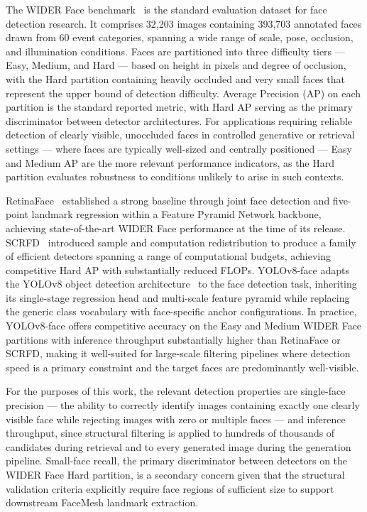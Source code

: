 The WIDER Face benchmark~\cite{Yang_2016_WIDERFace} is the standard
evaluation dataset for face detection research. It comprises 32,203 images
containing 393,703 annotated faces drawn from 60 event categories, spanning
a wide range of scale, pose, occlusion, and illumination conditions. Faces
are partitioned into three difficulty tiers --- Easy, Medium, and Hard ---
based on height in pixels and degree of occlusion, with the Hard partition
containing heavily occluded and very small faces that represent the upper
bound of detection difficulty. Average Precision (AP) on each partition is
the standard reported metric, with Hard AP serving as the primary
discriminator between detector architectures. For applications requiring
reliable detection of clearly visible, unoccluded faces in controlled
generative or retrieval settings --- where faces are typically well-sized
and centrally positioned --- Easy and Medium AP are the more relevant
performance indicators, as the Hard partition evaluates robustness to
conditions unlikely to arise in such contexts.

RetinaFace~\cite{Deng_2020_RetinaFace} established a strong baseline
through joint face detection and five-point landmark regression within a
Feature Pyramid Network backbone, achieving state-of-the-art WIDER Face
performance at the time of its release. SCRFD~\cite{Guo_2021_SCRFD}
introduced sample and computation redistribution to produce a family of
efficient detectors spanning a range of computational budgets, achieving
competitive Hard AP with substantially reduced FLOPs. YOLOv8-face adapts
the YOLOv8 object detection architecture~\cite{Jocher_2023_YOLOv8} to the
face detection task, inheriting its single-stage regression head and
multi-scale feature pyramid while replacing the generic class vocabulary
with face-specific anchor configurations. In practice, YOLOv8-face offers
competitive accuracy on the Easy and Medium WIDER Face partitions with
inference throughput substantially higher than RetinaFace or SCRFD,
making it well-suited for large-scale filtering pipelines where detection
speed is a primary constraint and the target faces are predominantly
well-visible.

For the purposes of this work, the relevant detection properties are
single-face precision --- the ability to correctly identify images
containing exactly one clearly visible face while rejecting images with
zero or multiple faces --- and inference throughput, since structural
filtering is applied to hundreds of thousands of candidates during
retrieval and to every generated image during the generation pipeline.
Small-face recall, the primary discriminator between detectors on the
WIDER Face Hard partition, is a secondary concern given that the
structural validation criteria explicitly require face regions of
sufficient size to support downstream FaceMesh landmark extraction.

